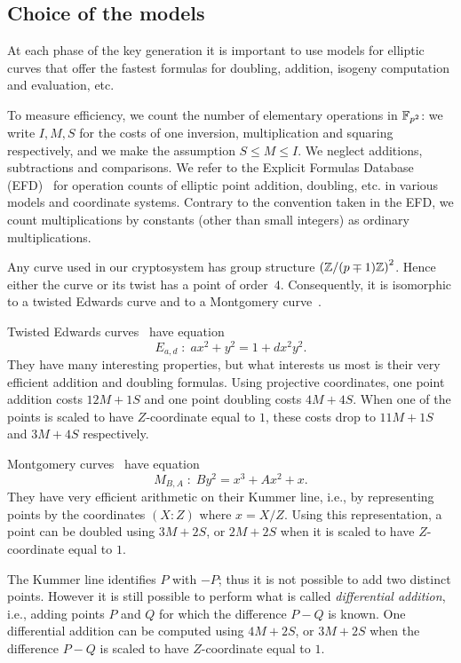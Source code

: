 \subsection{Choice of the models}\label{subsec:montgomery}

At each phase of the key generation it is important to use models for
elliptic curves that offer the fastest formulas for doubling,
addition, isogeny computation and evaluation, etc.

To measure efficiency, we count the number of elementary operations in
${\mathbb{F}}_{p^2}$: we write $I,M,S$ for the costs of one inversion,
multiplication and squaring respectively, and we make the assumption
$S\le M\le I$. We neglect additions, subtractions and comparisons. We
refer to the Explicit Formulas Database (EFD)~\cite{efd} for operation
counts of elliptic point addition, doubling, etc. in various models
and coordinate systems. Contrary to the convention taken in the EFD,
we count multiplications by constants (other than small integers) as
ordinary multiplications.

Any curve used in our cryptosystem has group structure
$\left({\mathbb{Z}}/(p\mp 1){\mathbb{Z}}\right)^2$. Hence either the curve or its twist
has a point of order~$4$. Consequently, it is isomorphic to a twisted
Edwards curve and to a Montgomery curve~\cite{twisted-edwards}.

Twisted Edwards curves~\cite{twisted-edwards} have equation
\begin{equation}
  \label{eq:twisted-ed}
  E_{a,d}\;:\;ax^2+y^2=1+dx^2y^2.
\end{equation}
They have many interesting properties, but what interests us most is
their very efficient addition and doubling formulas.  Using projective
coordinates, one point addition costs $12M+1S$ and one point doubling
costs $4M+4S$. When one of the points is scaled to have $Z$-coordinate
equal to $1$, these costs drop to $11M+1S$ and $3M+4S$ respectively.

Montgomery curves~\cite{montgomery} have equation
\begin{equation}
  \label{eq:montgomery}
  M_{B,A}\;:\;By^2 = x^3 + Ax^2 + x.
\end{equation}
They have very efficient arithmetic on their Kummer line, i.e., by
representing points by the coordinates $(X:Z)$ where $x=X/Z$.  Using
this representation, a point can be doubled using $3M+2S$, or $2M+2S$
when it is scaled to have $Z$-coordinate equal to $1$.

The Kummer line identifies $P$ with $-P$; thus it is not possible to
add two distinct points. However it is still possible to perform what
is called \emph{differential addition}, i.e., adding points $P$ and
$Q$ for which the difference $P-Q$ is known. One differential addition
can be computed using $4M+2S$, or $3M+2S$ when the difference $P-Q$ is
scaled to have $Z$-coordinate equal to $1$.

